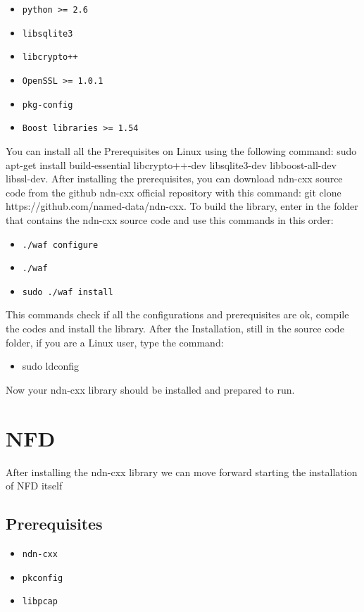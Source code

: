 \documentclass[10pt,letterpaper,extrafontsizes]{memoir}
\begin{document}
	\begin{itemize}
		
           \item    \texttt{python >= 2.6 }
	   \item    \texttt{libsqlite3 }
       	   \item    \texttt{libcrypto++ }
	   \item    \texttt{OpenSSL >= 1.0.1 }
           \item    \texttt{pkg-config }
	   \item    \texttt{Boost libraries >= 1.54 }    
	\end{itemize} 
You can install all the Prerequisites on Linux using the following command: sudo apt-get install build-essential libcrypto++-dev libsqlite3-dev libboost-all-dev libssl-dev. 
After installing the prerequisites, you can download ndn-cxx source code from the github ndn-cxx official repository with this command: git clone https://github.com/named-data/ndn-cxx.
To build the library, enter in the folder that contains the ndn-cxx source code and use this commands in this order:
\begin{itemize}
 \item \texttt{./waf configure} 
 \item \texttt{./waf}
 \item \texttt{sudo ./waf install}
\end{itemize}
This commands check if all the configurations and prerequisites are ok, compile the codes and install the library.
After the Installation, still in the source code folder, if you are a Linux user, type the command: 
\begin{itemize}
 \item sudo ldconfig 
\end{itemize}
Now your ndn-cxx library should be installed and prepared to run.
	\section{NFD}  After installing the ndn-cxx library we can move forward starting the installation of NFD itself
	\subsection{Prerequisites}
	\begin{itemize}
		\item \texttt{ndn-cxx}
		
		\item \texttt{pkconfig}
		
		\item \texttt{libpcap}
		
	\end{itemize}
\end{document}

